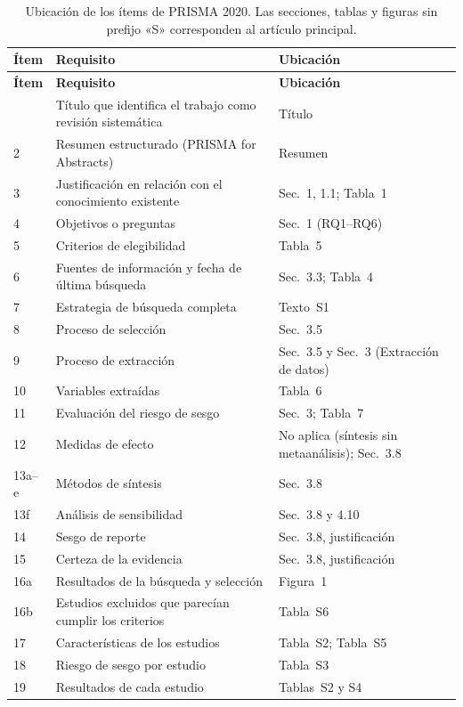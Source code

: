 \documentclass[12pt, a4paper]{article}
\begin{document}
\begin{small}
\begin{longtable}{lP{8.8cm}P{4.0cm}}
\caption{Ubicación de los ítems de PRISMA 2020. Las secciones, tablas y figuras sin prefijo «S» corresponden al artículo principal.\label{tab:prisma_check}}\\
\toprule
\textbf{Ítem} & \textbf{Requisito} & \textbf{Ubicación} \\
\midrule\endfirsthead
\toprule
\textbf{Ítem} & \textbf{Requisito} & \textbf{Ubicación} \\
\midrule\endhead
\bottomrule{} & Título que identifica el trabajo como revisión sistemática & Título \\
2 & Resumen estructurado (PRISMA for Abstracts) & Resumen \\
3 & Justificación en relación con el conocimiento existente & Sec.~1, 1.1; Tabla~1 \\
4 & Objetivos o preguntas & Sec.~1 (RQ1--RQ6) \\
5 & Criterios de elegibilidad & Tabla~5 \\
6 & Fuentes de información y fecha de última búsqueda & Sec.~3.3; Tabla~4 \\
7 & Estrategia de búsqueda completa & Texto~S1 \\
8 & Proceso de selección & Sec.~3.5 \\
9 & Proceso de extracción & Sec.~3.5 y Sec.~3 (Extracción de datos) \\
10 & Variables extraídas & Tabla~6 \\
11 & Evaluación del riesgo de sesgo & Sec.~3; Tabla~7 \\
12 & Medidas de efecto & No aplica (síntesis sin metaanálisis); Sec.~3.8 \\
13a--e & Métodos de síntesis & Sec.~3.8 \\
13f & Análisis de sensibilidad & Sec.~3.8 y 4.10 \\
14 & Sesgo de reporte & Sec.~3.8, justificación \\
15 & Certeza de la evidencia & Sec.~3.8, justificación \\
16a & Resultados de la búsqueda y selección & Figura~1 \\
16b & Estudios excluidos que parecían cumplir los criterios & Tabla~S6 \\
17 & Características de los estudios & Tabla~S2; Tabla~S5 \\
18 & Riesgo de sesgo por estudio & Tabla~S3 \\
19 & Resultados de cada estudio & Tablas~S2 y S4 \\

\end{longtable}
\end{small}
\end{document}

